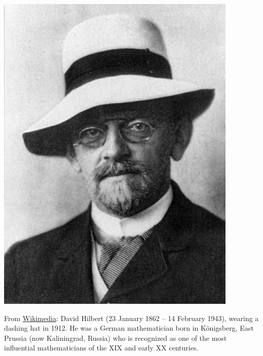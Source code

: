 \documentclass[../main.tex]{subfiles}
\begin{document}
\begin{marginfigure}
	\includegraphics[width=1\linewidth]{images/Hilbert.jpg}
	\caption[Photo of Hibert]{From \href{https://commons.wikimedia.org/wiki/File:Hilbert.jpg}{Wikimedia}: David Hilbert (23 January 1862 – 14 February 1943), wearing a dashing hat in 1912. He was a German mathematician born in Königsberg, East Prussia (now Kaliningrad, Russia) who is recognized as one of the most influential mathematicians of the XIX and early XX centuries.}
\end{marginfigure}
\end{document}
